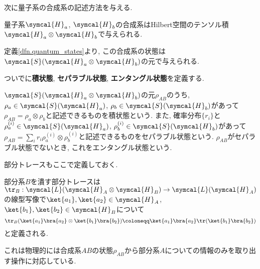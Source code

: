 

次に量子系の合成系の記述方法を与える. 
\begin{mydfn}[合成系]\label{dfn.composite_system}
  量子系$\symcal{H}_a$, $\symcal{H}_b$の合成系はHilbert空間のテンソル積$\symcal{H}_a\otimes\symcal{H}_b$で与えられる. 
\end{mydfn}
定義\ref{dfn.quantum_states}より, この合成系の状態は$\symcal{S}(\symcal{H}_a\otimes\symcal{H}_b)$の元で与えられる. 

ついでに\textbf{積状態}, \textbf{セパラブル状態}, \textbf{エンタングル状態}を定義する. 

\begin{mydfn}
  $\symcal{S}(\symcal{H}_a\otimes\symcal{H}_b)$の元$\rho_{AB}$のうち, $\rho_a\in\symcal{S}(\symcal{H}_a)$, $\rho_b\in\symcal{S}(\symcal{H}_b)$があって$\rho_{AB}=\rho_a\otimes\rho_b$と記述できるものを積状態という. 
  また, 確率分布$\{r_i\}$と$\rho_a^{(i)}\in\symcal{S}(\symcal{H}_a)$, $\rho_b^{(i)}\in\symcal{S}(\symcal{H}_b)$があって$\rho_{AB}=\sum_{i}r_i\rho_a^{(i)}\otimes\rho_b^{(i)}$と記述できるものをセパラブル状態という. 
  $\rho_{AB}$がセパラブル状態でないとき, これをエンタングル状態という. 
\end{mydfn}

部分トレースもここで定義しておく. 
\begin{mydfn}[部分トレース]
  部分系$B$を潰す部分トレースは$\tr_B:\symcal{L}(\symcal{H}_A\otimes \symcal{H}_B)\to \symcal{L}(\symcal{H}_A)$の線型写像で$\ket{a_1}, \ket{a_2}\in\symcal{H}_A$, $\ket{b_1}, \ket{b_2}\in\symcal{H}_B$について
  \begin{equation}
    \tr_B(\ket{a_1}\bra{a_2}\otimes\ket{b_1}\bra{b_2})\coloneqq\ket{a_1}\bra{a_2}\tr(\ket{b_1}\bra{b_2})
  \end{equation}
  と定義される. 
\end{mydfn}
これは物理的には合成系$AB$の状態$\rho_{AB}$から部分系$A$についての情報のみを取り出す操作に対応している. 
